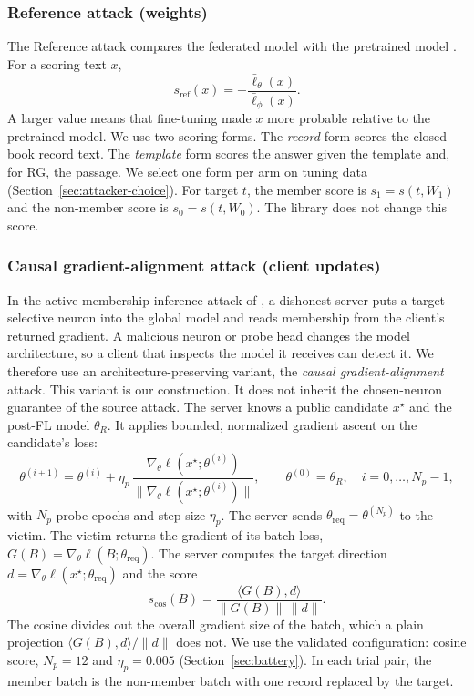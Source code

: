 \documentclass[11pt]{article}
\begin{document}
\subsubsection{Reference attack (weights)}\label{sec:reference}

The Reference attack compares the federated model with the pretrained model \citep{carlini2021extracting}. For a scoring text $x$,
\begin{equation}
  s_{\mathrm{ref}}(x)=-\frac{\bar\ell_\theta(x)}{\bar\ell_\phi(x)}.
  \label{eq:reference}
\end{equation}
A larger value means that fine-tuning made $x$ more probable relative to the pretrained model. We use two scoring forms. The \emph{record} form scores the closed-book record text. The \emph{template} form scores the answer given the template and, for RG, the passage. We select one form per arm on tuning data (Section~\ref{sec:attacker-choice}). For target $t$, the member score is $s_1=s(t,W_1)$ and the non-member score is $s_0=s(t,W_0)$. The library does not change this score.

\subsubsection{Causal gradient-alignment attack (client updates)}\label{sec:causal}

In the active membership inference attack of \citet{nguyen2023active}, a dishonest server puts a target-selective neuron into the global model and reads membership from the client's returned gradient. A malicious neuron or probe head changes the model architecture, so a client that inspects the model it receives can detect it. We therefore use an architecture-preserving variant, the \emph{causal gradient-alignment} attack. This variant is our construction. It does not inherit the chosen-neuron guarantee of the source attack. The server knows a public candidate $x^\star$ and the post-FL model $\theta_R$. It applies bounded, normalized gradient ascent on the candidate's loss:
\begin{equation}
  \theta^{(i+1)}=\theta^{(i)}+\eta_p\,\frac{\nabla_\theta\ell(x^\star;\theta^{(i)})}{\bigl\|\nabla_\theta\ell(x^\star;\theta^{(i)})\bigr\|},
  \qquad \theta^{(0)}=\theta_R,\quad i=0,\ldots,N_p-1,
\end{equation}
with $N_p$ probe epochs and step size $\eta_p$. The server sends $\theta_{\mathrm{req}}=\theta^{(N_p)}$ to the victim. The victim returns the gradient of its batch loss, $G(B)=\nabla_\theta\ell(B;\theta_{\mathrm{req}})$. The server computes the target direction $d=\nabla_\theta\ell(x^\star;\theta_{\mathrm{req}})$ and the score
\begin{equation}
  s_{\cos}(B)=\frac{\langle G(B),d\rangle}{\|G(B)\|\,\|d\|}.
  \label{eq:causal}
\end{equation}
The cosine divides out the overall gradient size of the batch, which a plain projection $\langle G(B),d\rangle/\|d\|$ does not. We use the validated configuration: cosine score, $N_p=12$ and $\eta_p=0.005$ (Section~\ref{sec:battery}). In each trial pair, the member batch is the non-member batch with one record replaced by the target.
\end{document}
